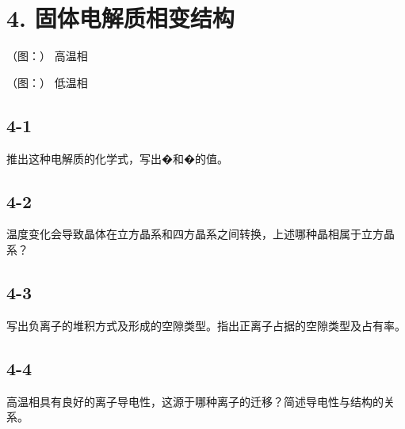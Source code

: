 \section*{4. 固体电解质相变结构}
（图：）
高温相

（图：）
低温相

\subsection*{4-1}
推出这种电解质的化学式，写出�和�的值。

\subsection*{4-2}
温度变化会导致晶体在⽴⽅晶系和四⽅晶系之间转换，上述哪种晶相属于⽴⽅晶系？

\subsection*{4-3}
写出负离⼦的堆积⽅式及形成的空隙类型。指出正离⼦占据的空隙类型及占有率。

\subsection*{4-4}
⾼温相具有良好的离⼦导电性，这源于哪种离⼦的迁移？简述导电性与结构的关系。
